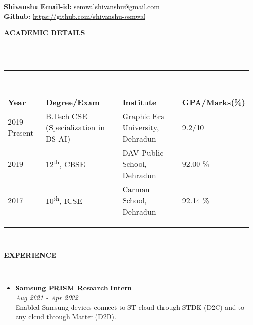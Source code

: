 \documentclass[a4paper,10pt]{article}
\newcommand{\lsep}{-0.5cm}
\newcommand{\resheading}[1]{{\small \colorbox{mygrey}{\begin{minipage}{0.975\textwidth}{\textbf{#1 \vphantom{p\^{E}}}}\end{minipage}}}}
\begin{document}
\begin{multicols}{2}
    \indent\raggedright\textbf{\huge Shivanshu}\newline
    \vfill\null
    \columnbreak
    \indent \textbf{Email-id:} \href{mailto://semwalshivanshu@gmail.com}{semwalshivanshu@gmail.com} \\
    \indent \textbf{Github:} \href{https://github.com/shivanshu-semwal}{https://github.com/shivanshu-semwal}\\
\end{multicols}



\resheading{\textbf{ACADEMIC DETAILS} }\\[\lsep]
\\
\indent \rule{6.8in}{0.4pt}\\
\indent \begin{tabular}{ l @{\hskip 0.15in} l @{\hskip 0.15in} l @{\hskip 0.15in} l @{\hskip 0.15in} }
    \noindent \textbf{Year} & \textbf{Degree/Exam}                 & \textbf{Institute}               & \textbf{GPA/Marks(\%)} \\
    2019 - Present          & B.Tech CSE (Specialization in DS-AI) & Graphic Era University, Dehradun & 9.2/10 \               \\
    2019                    & 12\textsuperscript{th}, CBSE         & DAV Public School, Dehradun      & 92.00 \%               \\
    2017                    & 10\textsuperscript{th}, ICSE         & Carman School, Dehradun          & 92.14 \%               \\
\end{tabular}
\indent \rule{6.8in}{0.4pt}
\\

\resheading{\textbf{EXPERIENCE} }\\[\lsep]
\begin{itemize}
    \setlength\itemsep{0em}
    \item \noindent \textbf{Samsung PRISM Research Intern} \\
          \textit{Aug 2021 - Apr 2022} \\
          Enabled Samsung devices connect to ST cloud through STDK (D2C) and to any cloud through Matter (D2D).
\end{itemize}
\end{document}
